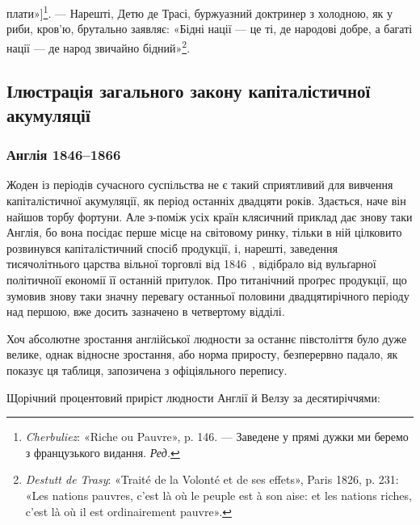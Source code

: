 \parcont{}  %
плати»]\footnote*{
\emph{Cherbuliez}: «Riche ou Pauvre», p. 146. — Заведене у прямі дужки
ми беремо з французького видання. \emph{Ред.}
}. — Нарешті, Детю де Трасі, буржуазний доктринер з
холодною, як у риби, кров’ю, брутально заявляє: «Бідні нації —
це ті, де народові добре, а багаті нації — де народ звичайно бідний»\footnote{
\emph{Destutt de Trasy}: «Traité de la Volonté et de ses effets», Paris
1826, p. 231: «Les nations pauvres, c’est là où le peuple est à son aise: et
les nations riches, c’est là où il est ordinairement pauvre».
}.

\subsection{Ілюстрація загального закону капіталістичної акумуляції}

\subsubsection{Англія 1846--1866~}

Жоден із періодів сучасного суспільства не є такий сприятливий
для вивчення капіталістичної акумуляції, як період останніх
двадцяти років. Здається, наче він найшов торбу фортуни.
Але з-поміж усіх країн клясичний приклад дає знову таки
Англія, бо вона посідає перше місце на світовому ринку,
тільки в ній цілковито розвинувся капіталістичний спосіб продукції,
і, нарешті, заведення тисячолітнього царства вільної
торговлі від 1846~, відібрало від вульґарної політичноїї економії
її останній притулок. Про титанічний проґрес продукції, що зумовив
знову таки значну перевагу останньої половини двадцятирічного
періоду над першою, вже досить зазначено в четвертому
відділі.

Хоч абсолютне зростання англійської людности за останнє півстоліття
було дуже велике, однак відносне зростання, або норма
приросту, безперервно падало, як показує ця таблиця, запозичена
з офіціяльного перепису.

Щорічний процентовий приріст людности Англії й Велзу
за десятиріччями:

